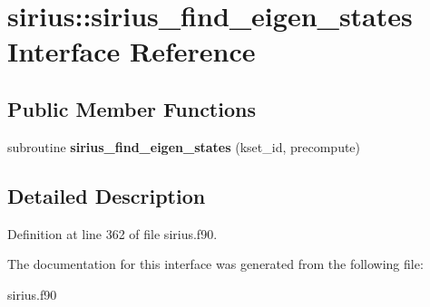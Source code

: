 \hypertarget{interfacesirius_1_1sirius__find__eigen__states}{}\section{sirius\+:\+:sirius\+\_\+find\+\_\+eigen\+\_\+states Interface Reference}
\label{interfacesirius_1_1sirius__find__eigen__states}
\subsection*{Public Member Functions}
\begin{DoxyCompactItemize}
\item 
\hypertarget{interfacesirius_1_1sirius__find__eigen__states_ae613440faa508d70fe65dddd2076879a}{}subroutine {\bfseries sirius\+\_\+find\+\_\+eigen\+\_\+states} (kset\+\_\+id, precompute)\label{interfacesirius_1_1sirius__find__eigen__states_ae613440faa508d70fe65dddd2076879a}

\end{DoxyCompactItemize}


\subsection{Detailed Description}


Definition at line 362 of file sirius.\+f90.



The documentation for this interface was generated from the following file\+:\begin{DoxyCompactItemize}
\item 
sirius.\+f90\end{DoxyCompactItemize}
